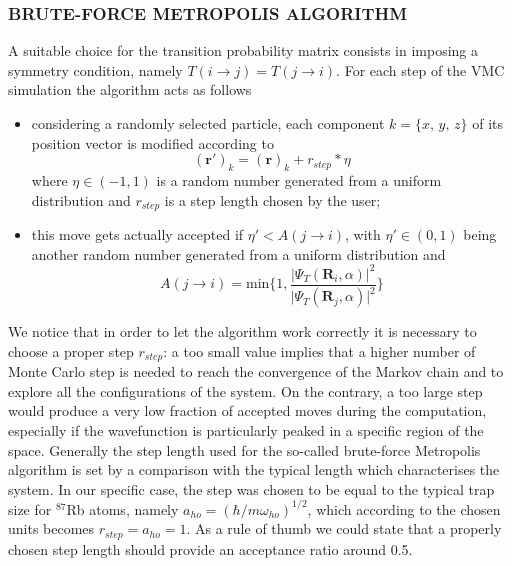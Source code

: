 \subsubsection{BRUTE-FORCE METROPOLIS ALGORITHM}
A suitable choice for the transition probability matrix consists in imposing a symmetry condition, namely $T( i\rightarrow j) = T(j \rightarrow i)$. For each step of the VMC simulation the algorithm acts as follows
\begin{itemize}
    \item considering a randomly selected particle, each  component $k = \{x,\,y,\,z\}$ of its position vector is modified according to
    \begin{equation*}
        (\bm{r}')_k = (\bm{r})_k + r_{step} \ast \eta
    \end{equation*}
    where $\eta \in (-1, 1)$ is a random number generated from a uniform distribution and $r_{step}$ is a step length chosen by the user;
    \item this move gets actually accepted if $\eta' < A(j\rightarrow i)$, with $\eta' \in (0,1)$ being another random number generated from a uniform distribution and
    \begin{equation}
        A(j \rightarrow i) = \text{min} \bigg\{ 1, \frac{\vert \Psi_T(\bm{R}_i, \alpha) \vert^2 }{\vert \Psi_T(\bm{R}_j, \alpha) \vert^2 } \bigg\}
        \label{acceptance_metropolis}
    \end{equation}
\end{itemize}
We notice that in order to let the algorithm work correctly it is necessary to choose a proper step $r_{step}$: a too small value implies that a higher number of Monte Carlo step is needed to reach the convergence of the Markov chain and to explore all the configurations of the system. On the contrary, a too large step would produce a very low fraction of accepted moves during the computation, especially if the wavefunction is particularly peaked in a specific region of the space. Generally the step length used for the so-called brute-force Metropolis algorithm \cite{metropolis} is set by a comparison with the typical length which characterises the system. In our specific case, the step was chosen to be equal to the typical trap size for $^{87}$Rb atoms, namely $a_{ho}=(\hbar/m\omega_{ho})^{1/2}$, which according to the chosen units becomes $r_{step}=a_{ho}=1$. As a rule of thumb we could state that a properly chosen step length should provide an acceptance ratio around 0.5.




